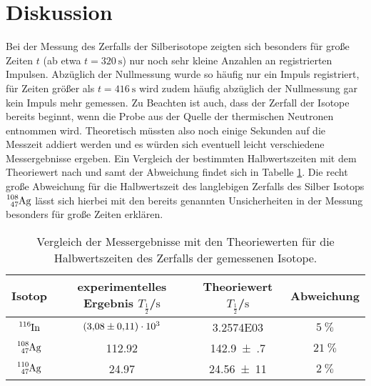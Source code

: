 \section{Diskussion}
\label{sec:Diskussion}
Bei der Messung des Zerfalls der Silberisotope zeigten sich besonders für große Zeiten $t$ (ab etwa $t=\SI{320}{\second}$) nur noch sehr kleine Anzahlen an registrierten Impulsen. Abzüglich der Nullmessung wurde so häufig nur ein Impuls registriert, für Zeiten größer als $t=\SI{416}{\second}$ wird zudem häufig abzüglich der Nullmessung gar kein Impuls mehr gemessen.
Zu Beachten ist auch, dass der Zerfall der Isotope bereits beginnt, wenn die Probe aus der Quelle der thermischen Neutronen entnommen wird.
Theoretisch müssten also noch einige Sekunden auf die Messzeit addiert werden und es würden sich eventuell leicht verschiedene Messergebnisse ergeben.
Ein Vergleich der bestimmten Halbwertszeiten mit dem Theoriewert nach \cite{silber} und
\cite{indium} samt der Abweichung findet sich in Tabelle \ref{tab:theor}. Die recht große Abweichung für die Halbwertszeit des langlebigen Zerfalls des Silber Isotops $\ce{^{108}_47Ag}$ lässt sich hierbei mit den bereits genannten Unsicherheiten in der Messung besonders für große Zeiten erklären.
\begin{table}
  \centering
  \caption{Vergleich der Messergebnisse mit den Theoriewerten für die Halbwertszeiten des Zerfalls der gemessenen Isotope.}
  \label{tab:theor}
  \begin{tabular}{cccc}
  \toprule
  Isotop&experimentelles Ergebnis $T_\frac{1}{2}$/$\si{\second}$&Theoriewert $T_\frac{1}{2}$/$\si{\second}$ &Abweichung\\
  \midrule
	  $\ce{^{116}In}$&$\num{3.08(11)E03}$ & \num{3.2574E03} & $\SI{5}{\percent}$ \\
  $\ce{^{108}_47Ag}$&\num{112.92}&\num{142.9(7)}&$\SI{21}{\percent}$\\
  $\ce{^{110}_47Ag}$&\num{24.97}&\num{24,56(11)}&$\SI{2}{\percent}$\\
  \bottomrule
  \end{tabular}
\end{table}
